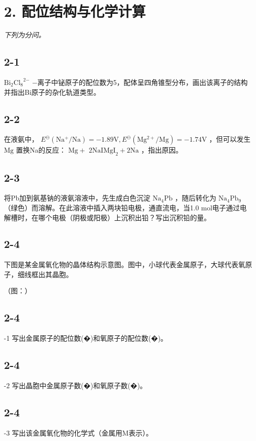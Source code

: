 \section*{2. 配位结构与化学计算}
\textit{下列为分问。}

\subsection*{2-1}
$\mathrm { B i _ { 2 } C l _ { 8 } } ^ { 2 \mathrm { - } }$ −离⼦中铋原⼦的配位数为5，配体呈四⻆锥型分布，画出该离⼦的结构并指出Bi原⼦的杂化轨道类型。

\subsection*{2-2}
在液氨中， $E ^ { \ominus } \mathrm { ( N a ^ { + } / N a ) } = - 1 . 8 9 \mathrm { V } , E ^ { \ominus } \mathrm { ( M g ^ { 2 + } / M g ) } = - 1 . 7 4 \mathrm { V }$ ，但可以发⽣ $\mathrm { M g }$ 置换Na的反应： $\mathrm { M g + }$ $2 \mathrm { N a I }  \mathrm { M g I } _ { 2 } + 2 \mathrm { N a }$ ，指出原因。

\subsection*{2-3}
将Pb加到氨基钠的液氨溶液中，先⽣成⽩⾊沉淀 $\mathrm { N a } _ { 4 } \mathrm { P b }$ ，随后转化为 $\mathrm { N a } _ { 4 } \mathrm { P b } _ { 9 }$ （绿⾊）⽽溶解。在此溶液中插⼊两块铅电极，通直流电，当1.0 mol电⼦通过电解槽时，在哪个电极（阴极或阳极）上沉积出铅？写出沉积铅的量。

\subsection*{2-4}
下图是某⾦属氧化物的晶体结构⽰意图。图中，⼩球代表⾦属原⼦，⼤球代表氧原⼦，细线框出其晶胞。

（图：）

\subsection*{2-4}
-1 写出⾦属原⼦的配位数(�)和氧原⼦的配位数(�)。

\subsection*{2-4}
-2 写出晶胞中⾦属原⼦数(�)和氧原⼦数(�)。

\subsection*{2-4}
-3 写出该⾦属氧化物的化学式（⾦属⽤M表⽰）。


